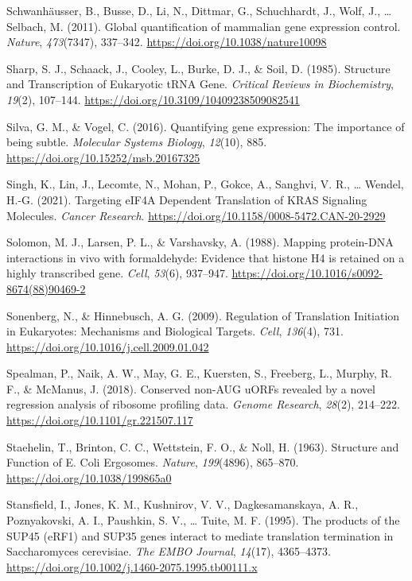 \documentclass[12pt,openany]{book}
\begin{document}
\hypertarget{ref-Schwanhausser2011}{}
Schwanhäusser, B., Busse, D., Li, N., Dittmar, G., Schuchhardt, J.,
Wolf, J., \ldots{} Selbach, M. (2011). Global quantification of
mammalian gene expression control. \emph{Nature}, \emph{473}(7347),
337--342. \url{https://doi.org/10.1038/nature10098}

\hypertarget{ref-Sharp1985}{}
Sharp, S. J., Schaack, J., Cooley, L., Burke, D. J., \& Soil, D. (1985).
Structure and Transcription of Eukaryotic tRNA Gene. \emph{Critical
Reviews in Biochemistry}, \emph{19}(2), 107--144.
\url{https://doi.org/10.3109/10409238509082541}

\hypertarget{ref-Silva2016}{}
Silva, G. M., \& Vogel, C. (2016). Quantifying gene expression: The
importance of being subtle. \emph{Molecular Systems Biology},
\emph{12}(10), 885. \url{https://doi.org/10.15252/msb.20167325}

\hypertarget{ref-Singh2021}{}
Singh, K., Lin, J., Lecomte, N., Mohan, P., Gokce, A., Sanghvi, V. R.,
\ldots{} Wendel, H.-G. (2021). Targeting eIF4A Dependent Translation of
KRAS Signaling Molecules. \emph{Cancer Research}.
\url{https://doi.org/10.1158/0008-5472.CAN-20-2929}

\hypertarget{ref-Solomon1988}{}
Solomon, M. J., Larsen, P. L., \& Varshavsky, A. (1988). Mapping
protein-DNA interactions in vivo with formaldehyde: Evidence that
histone H4 is retained on a highly transcribed gene. \emph{Cell},
\emph{53}(6), 937--947.
\url{https://doi.org/10.1016/s0092-8674(88)90469-2}

\hypertarget{ref-Sonenberg2009}{}
Sonenberg, N., \& Hinnebusch, A. G. (2009). Regulation of Translation
Initiation in Eukaryotes: Mechanisms and Biological Targets.
\emph{Cell}, \emph{136}(4), 731.
\url{https://doi.org/10.1016/j.cell.2009.01.042}

\hypertarget{ref-Spealman2018}{}
Spealman, P., Naik, A. W., May, G. E., Kuersten, S., Freeberg, L.,
Murphy, R. F., \& McManus, J. (2018). Conserved non-AUG uORFs revealed
by a novel regression analysis of ribosome profiling data. \emph{Genome
Research}, \emph{28}(2), 214--222.
\url{https://doi.org/10.1101/gr.221507.117}

\hypertarget{ref-Staehelin1963}{}
Staehelin, T., Brinton, C. C., Wettstein, F. O., \& Noll, H. (1963).
Structure and Function of E. Coli Ergosomes. \emph{Nature},
\emph{199}(4896), 865--870. \url{https://doi.org/10.1038/199865a0}

\hypertarget{ref-Stansfield1995}{}
Stansfield, I., Jones, K. M., Kushnirov, V. V., Dagkesamanskaya, A. R.,
Poznyakovski, A. I., Paushkin, S. V., \ldots{} Tuite, M. F. (1995). The
products of the SUP45 (eRF1) and SUP35 genes interact to mediate
translation termination in Saccharomyces cerevisiae. \emph{The EMBO
Journal}, \emph{14}(17), 4365--4373.
\url{https://doi.org/10.1002/j.1460-2075.1995.tb00111.x}
\end{document}
